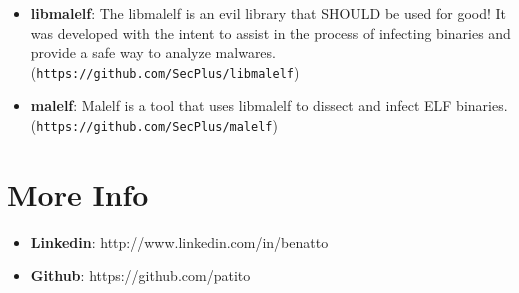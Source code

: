 \documentclass[margin]{res}
\begin{document}
\begin{resume}
\begin{itemize}
		    \item \textbf{libmalelf}: The libmalelf is an evil library that SHOULD be used for good! It was developed
		                              with the intent to assist in the process of infecting binaries and provide a safe 
		                              way to analyze malwares. (\texttt{https://github.com/SecPlus/libmalelf})\vspace{1mm}
		                              
		    \item \textbf{malelf}: Malelf is a tool that uses libmalelf to dissect and infect ELF binaries. 
		                           (\texttt{https://github.com/SecPlus/malelf})
		\end{itemize}
 
\section{More Info}
    \begin{itemize}
        \item \textbf{Linkedin}: http://www.linkedin.com/in/benatto
         \item \textbf{Github}: https://github.com/patito
    \end{itemize}


\end{resume} 
\end{document}
